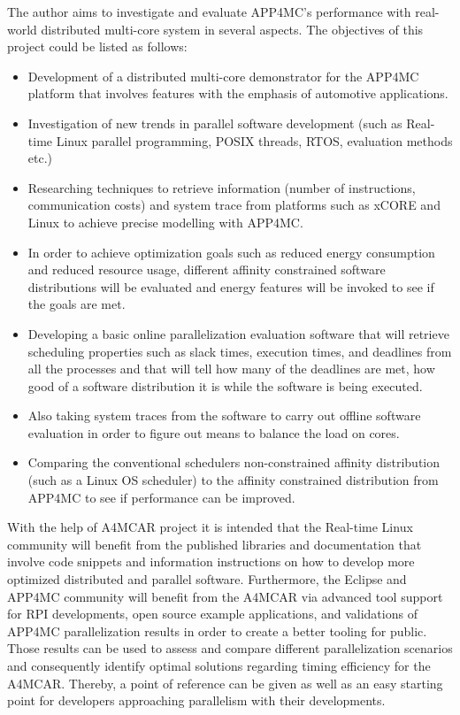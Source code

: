 The author aims to investigate and evaluate APP4MC's performance with real-world distributed multi-core system in several aspects. The objectives of this project could be listed as follows:
\begin{itemize}
	\item Development of a distributed multi-core demonstrator for the APP4MC platform that involves features with the emphasis of automotive applications.
	\item Investigation of new trends in parallel software development (such as Real-time Linux parallel programming, POSIX threads, RTOS, evaluation methods etc.)
	\item Researching techniques to retrieve information (number of instructions, communication costs) and system trace from platforms such as xCORE and Linux to achieve precise modelling with APP4MC.
	\item In order to achieve optimization goals such as reduced energy consumption and reduced resource usage, different affinity constrained software distributions will be evaluated and energy features will be invoked to see if the goals are met.
	\item Developing a basic online parallelization evaluation software that will retrieve scheduling properties such as slack times, execution times, and deadlines from all the processes and that will tell how many of the deadlines are met, how good of a software distribution it is while the software is being executed.
	\item Also taking system traces from the software to carry out offline software evaluation in order to figure out means to balance the load on cores.
	\item Comparing the conventional schedulers non-constrained affinity distribution (such as a Linux OS scheduler) to the affinity constrained distribution from APP4MC to see if performance can be improved.
\end{itemize}

With the help of A4MCAR project it is intended that the Real-time Linux community will benefit from the published libraries and documentation that involve code snippets and information instructions on how to develop more optimized distributed and parallel software. Furthermore, the Eclipse and APP4MC community will benefit from the A4MCAR via advanced tool support for RPI developments, open source example applications, and validations of APP4MC parallelization results in order to create a better tooling for public. Those results can be used to assess and compare different parallelization scenarios and consequently identify optimal solutions regarding timing efficiency for the A4MCAR. Thereby, a point of reference can be given as well as an easy starting point for developers approaching parallelism with their developments. 

